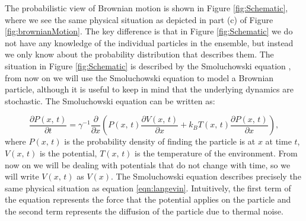 The probabilistic view of Brownian motion is shown in Figure \ref{fig:Schematic}, where we see the same physical situation as depicted in part (c) of Figure \ref{fig:brownianMotion}. The key difference is that in Figure \ref{fig:Schematic} we do not have any knowledge of the individual particles in the ensemble, but instead we only know about the probability distribution that describes them. The situation in Figure \ref{fig:Schematic} is described by the Smoluchowski equation \cite{Gardiner2009}, from now on we will use the Smoluchowski equation to model a Brownian particle, although it is useful to keep in mind that the underlying dynamics are stochastic. The Smoluchowski equation can be written as:

\begin{equation}
\frac{\partial P(x, \, t)}{\partial t} =  \gamma^{-1} \frac{\partial}{\partial x} \left (P(x, \, t) \frac{\partial V(x, \, t)}{\partial x} + k_B T(x,  \, t) \frac{\partial P(x, \, t)}{\partial x} \right ), \label{eqn:smoluchowskiIntro}
\end{equation}
where $P(x, \, t)$ is the probability density of finding the particle is at $x$ at time $t$, $V(x, \, t )$ is the potential, $T(x, \, t)$ is the temperature of the environment. From now on we will be dealing with potentials that do not change with time, so we will write $V(x, \, t)$ as $V(x)$. The Smoluchowski equation describes precisely the same physical situation as equation \ref{eqn:langevin}. Intuitively, the first term of the equation represents the force that the potential applies on the particle and the second term represents the diffusion of the particle due to thermal noise.

